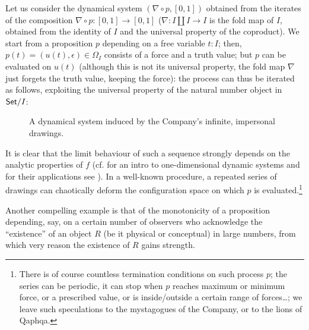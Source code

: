 \begin{example}
	Let us consider the dynamical system $(\nabla\circ p, [0,1])$ obtained from the iterates of the composition $\nabla \circ p : [0,1] \to [0,1]$ ($\nabla : I\amalg I \to I$ is the fold map of $I$, obtained from the identity of $I$ and the universal property of the coproduct). We start from a proposition $p$ depending on a free variable $t : I$; then, $p(t) = (u(t),\epsilon)\in \Omega_I$ consists of a force and a truth value; but $p$ can be evaluated on $u(t)$ (although this is not its universal property, the fold map $\nabla$ just forgets the truth value, keeping the force): the process can thus be iterated as follows, exploiting the universal property of the natural number object in $\mathsf{Set}/I$:
	\begin{center}
		\begin{figure}[h]
			\def\line{\draw (0,0) -- (1,0); \draw (0,.5) -- (1,.5);}
			\caption{A dynamical system induced by the Company's infinite, impersonal drawings.}
			\label{fig_dynamics}
		\end{figure}
	\end{center}
	It is clear that the limit behaviour of such a sequence strongly depends on the analytic properties of $f$ (cf. \cite{strogatz1996nonlinear} for an intro to one-dimensional dynamic systems and for their applications see \cite{wiggins2003introduction}). In a well-known procedure, a repeated series of drawings can chaotically deform the configuration space on which $p$ is evaluated.\footnote{There is of course countless termination conditions on such process $p$; the series can be periodic, it can stop when $p$ reaches maximum or minimum force, or a prescribed value, or is inside/outside a certain range of forces\dots; we leave such speculations to the mystagogues of the Company, or to the lions of Qaphqa.}
\end{example}
Another compelling example is that of the monotonicity of a proposition depending, say, on a certain number of observers who acknowledge the ``existence'' of an object $R$ (be it physical or conceptual) in large numbers, from which very reason the existence of $R$ gains strength.
